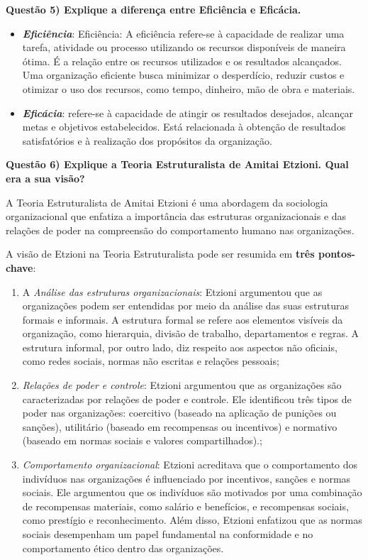 \documentclass[11pt]{article}
\begin{document}
\noindent \textbf{Questão 5) Explique a diferença entre Eficiência e Eficácia.}\par
\begin{itemize}
    \item \textbf{\emph{Eficiência}}: Eficiência: A eficiência refere-se à capacidade de realizar uma tarefa, atividade ou processo utilizando os recursos disponíveis de maneira ótima. É a relação entre os recursos utilizados e os resultados alcançados. Uma organização eficiente busca minimizar o desperdício, reduzir custos e otimizar o uso dos recursos, como tempo, dinheiro, mão de obra e materiais.
    \item \textbf{\emph{Eficácia}}: refere-se à capacidade de atingir os resultados desejados, alcançar metas e objetivos estabelecidos. Está relacionada à obtenção de resultados satisfatórios e à realização dos propósitos da organização.
\end{itemize}

\noindent \textbf{Questão 6) Explique a Teoria Estruturalista de Amitai Etzioni. Qual era a sua visão?}\par
A Teoria Estruturalista de Amitai Etzioni é uma abordagem da sociologia organizacional que enfatiza a importância das estruturas organizacionais e das relações de poder na compreensão do comportamento humano nas organizações.\par
A visão de Etzioni na Teoria Estruturalista pode ser resumida em \textbf{três pontos-chave}:
\begin{enumerate}
    \item A \emph{Análise das estruturas organizacionais}: Etzioni argumentou que as organizações podem ser entendidas por meio da análise das suas estruturas formais e informais. A estrutura formal se refere aos elementos visíveis da organização, como hierarquia, divisão de trabalho, departamentos e regras. A estrutura informal, por outro lado, diz respeito aos aspectos não oficiais, como redes sociais, normas não escritas e relações pessoais;
    \item \emph{Relações de poder e controle}: Etzioni argumentou que as organizações são caracterizadas por relações de poder e controle. Ele identificou três tipos de poder nas organizações: coercitivo (baseado na aplicação de punições ou sanções), utilitário (baseado em recompensas ou incentivos) e normativo (baseado em normas sociais e valores compartilhados).;
    \item \emph{Comportamento organizacional}: Etzioni acreditava que o comportamento dos indivíduos nas organizações é influenciado por incentivos, sanções e normas sociais. Ele argumentou que os indivíduos são motivados por uma combinação de recompensas materiais, como salário e benefícios, e recompensas sociais, como prestígio e reconhecimento. Além disso, Etzioni enfatizou que as normas sociais desempenham um papel fundamental na conformidade e no comportamento ético dentro das organizações.
\end{enumerate}
\end{document}
